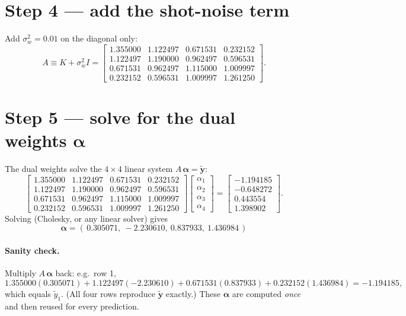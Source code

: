 \documentclass[11pt]{article}
\begin{document}
\section{Step 4 --- add the shot-noise term}

Add $\sigma_w^2=0.01$ on the diagonal only:
\begin{equation}
A\equiv K+\sigma_w^2 I=
\begin{bmatrix}
1.355000 & 1.122497 & 0.671531 & 0.232152\\
1.122497 & 1.190000 & 0.962497 & 0.596531\\
0.671531 & 0.962497 & 1.115000 & 1.009997\\
0.232152 & 0.596531 & 1.009997 & 1.261250
\end{bmatrix}.
\end{equation}

\section{Step 5 --- solve for the dual weights \texorpdfstring{$\bm\alpha$}{alpha}}

The dual weights solve the $4\times4$ linear system $A\,\bm\alpha=\tilde{\bm y}$:
\begin{equation}
\begin{bmatrix}
1.355000 & 1.122497 & 0.671531 & 0.232152\\
1.122497 & 1.190000 & 0.962497 & 0.596531\\
0.671531 & 0.962497 & 1.115000 & 1.009997\\
0.232152 & 0.596531 & 1.009997 & 1.261250
\end{bmatrix}
\begin{bmatrix}\alpha_1\\\alpha_2\\\alpha_3\\\alpha_4\end{bmatrix}
=
\begin{bmatrix}-1.194185\\-0.648272\\0.443554\\1.398902\end{bmatrix}.
\end{equation}
Solving (Cholesky, or any linear solver) gives
\begin{equation}
\boxed{\;\bm\alpha=(\,0.305071,\ -2.230610,\ 0.837933,\ 1.436984\,)\;}
\end{equation}
\paragraph{Sanity check.} Multiply $A\,\bm\alpha$ back: e.g.\ row 1,
\[
1.355000(0.305071)+1.122497(-2.230610)+0.671531(0.837933)+0.232152(1.436984)=-1.194185,
\]
which equals $\tilde y_1$. (All four rows reproduce $\tilde{\bm y}$ exactly.) These
$\bm\alpha$ are computed \emph{once} and then reused for every prediction.
\end{document}
